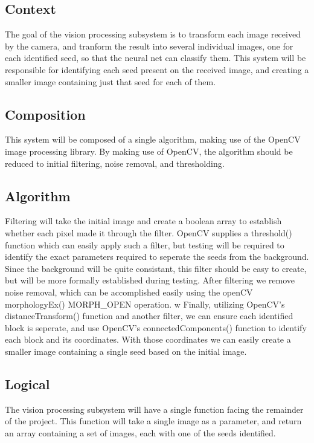 
\subsection{Context}

The goal of the vision processing subsystem is to transform each image received by the camera, and tranform the result into several
individual images, one for each identified seed, so that the neural net can classify them. 
This system will be responsible for identifying each seed present on the received image,
and creating a smaller image containing just that seed for each of them.

\subsection{Composition} 

This system will be composed of a single algorithm, making use of the OpenCV image processing library.
By making use of OpenCV, the algorithm should be reduced to initial filtering, noise removal, and thresholding.

\subsection{Algorithm}
Filtering will take the initial image and create a boolean array to establish whether each pixel made it through the filter.
OpenCV supplies a threshold() function which can easily apply such a filter, but testing will be required to identify the exact parameters required to seperate the seeds
from the background.
Since the background will be quite consistant, this filter should be easy to create, but will be more formally established during testing.
After filtering we remove noise removal, which can be accomplished easily using the openCV morphologyEx() MORPH\_OPEN operation.
w
Finally, utilizing OpenCV's distanceTransform() function and another filter, we can ensure each identified block is seperate, and use OpenCV's connectedComponents() function to identify each block and its coordinates.
With those coordinates we can easily create a smaller image containing a single seed based on the initial image.

\subsection{Logical}

The vision processing subsystem will have a single function facing the remainder of the project. 
This function will take a single image as a parameter, and return an array containing
a set of images, each with one of the seeds identified. 


